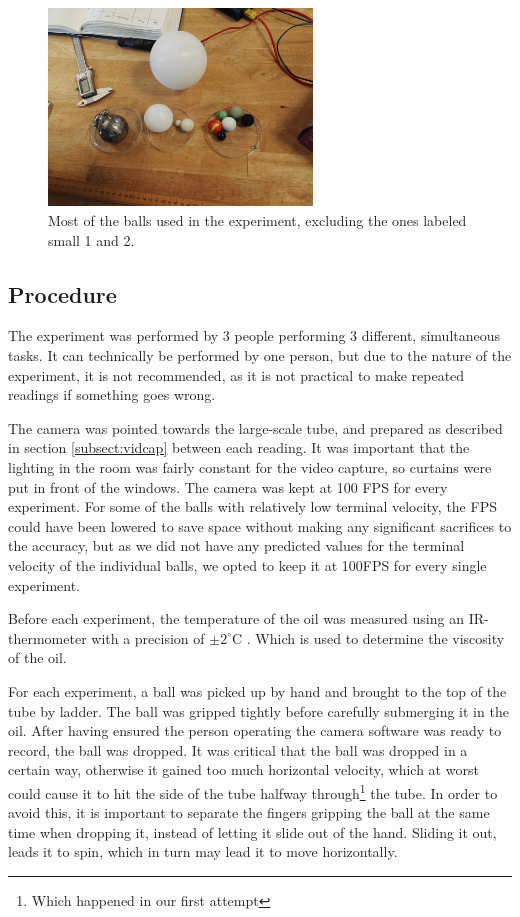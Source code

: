 \documentclass[11pt,a4paper]{article}
\begin{document}
    \begin{figure}[H]
      \center
      \includegraphics[width=7cm]{scripts/figs/IMG_20180321_131204.jpg}
      \caption{Most of the balls used in the experiment, excluding the ones labeled small 1 and 2.}
      \label{fig:balls}
    \end{figure}

  \subsection{Procedure}
    The experiment was performed by 3 people performing 3 different, simultaneous tasks. It can technically be performed by one person, but due to the nature of the experiment, it is not recommended, as it is not practical to make repeated readings if something goes wrong.

    The camera was pointed towards the large-scale tube, and prepared as described in section \ref{subsect:vidcap} between each reading. It was important that the lighting in the room was fairly constant for the video capture, so curtains were put in front of the windows. The camera was kept at 100 FPS for every experiment. For some of the balls with relatively low terminal velocity, the FPS could have been lowered to save space without making any significant sacrifices to the accuracy, but as we did not have any predicted values for the terminal velocity of the individual balls, we opted to keep it at 100FPS for every single experiment.

    Before each experiment, the temperature of the oil was measured using an IR-thermometer with a precision of $\pm2^\circ$C \cite{_fluke_????}. Which is used to determine the viscosity of the oil.

    For each experiment, a ball was picked up by hand and brought to the top of the tube by ladder. The ball was gripped tightly before carefully submerging it in the oil. After having ensured the person operating the camera software was ready to record, the ball was dropped. It was critical that the ball was dropped in a certain way, otherwise it gained too much horizontal velocity, which at worst could cause it to hit the side of the tube halfway through\footnote{Which happened in our first attempt} the tube. In order to avoid this, it is important to separate the fingers gripping the ball at the same time when dropping it, instead of letting it slide out of the hand. Sliding it out, leads it to spin, which in turn may lead it to move horizontally.
\end{document}
